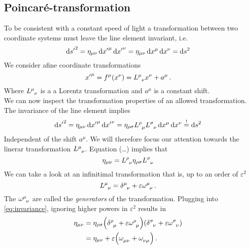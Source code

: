 \subsection{Poincaré-transformation}
To be consistent with a constant speed of light a transformation between two
coordinate systems must leave the line element invariant, i.e.
\begin{equation}
\dif {s^\prime}^2 = \eta_{\mu\nu}\dif {x^\prime}^\mu\dif
{x^\prime}^\nu=\eta_{\mu\nu}\dif x^\mu\dif
x^\nu = \dif s^2
\end{equation}
We consider afine coordinate transformations 
\begin{equation}
{x^\prime}^\mu= f^\mu(x^\nu)=\tensor{L}{^\mu_\nu}x^\nu+a^\mu\, .
\end{equation}
Where $\tensor{L}{^\mu_\nu}$ is a a Lorentz transformation and $a^\mu$ is a
constant shift.\\
We can now inspect the transformation properties of an allowed transformation.
The invariance of the line element implies
\begin{equation}
\dif {s^\prime}^2 = \eta_{\mu\nu}\dif {x^\prime}^\mu\dif
{x^\prime}^\nu=\eta_{\rho\sigma}\tensor{L}{^\rho_\mu}\tensor{L}{^\sigma_\nu}\dif
x^\mu\dif x^\nu \stackrel{!}{=} \dif s^2
\end{equation}
Independent of the shift $a^\mu$. We will therefore focus our attention towards
the linerar transformation $\tensor{L}{^\mu_\nu}$. Equation (\ldots) implies
that
\begin{equation}
\eta_{\mu\nu}=\tensor{L}{^\rho_\nu}\eta_{\rho\sigma}\tensor{L}{^\sigma_\nu}\label{eq:invariance}
\end{equation}
We can take a look at an infinitimal transformation that is, up to an order of
$\varepsilon^2$
\begin{equation}
\tensor{L}{^\mu_\nu}=\tensor{\delta}{^\mu_\nu}
+\varepsilon\tensor{\omega}{^\mu_\nu}\, .
\end{equation}
The $\tensor{\omega}{^\mu_\nu}$ are called the \emph{generators} of the
transformation. Plugging into \eqref{eq:invariance}, ignoring higher powers in
$\varepsilon^2$ results in
\begin{equation}
\begin{split}
\eta_{\mu\nu}&=\eta_{\rho\sigma}\left(\tensor{\delta}{^\rho_\mu}
+\varepsilon\tensor{\omega}{^\rho_\mu}\right)\left(\tensor{\delta}{^\sigma_\nu}
+\varepsilon\tensor{\omega}{^\sigma_\nu}\right)\\
&=
\eta_{\mu\nu}+\varepsilon\left(\tensor{\omega}{_\mu_\nu}+\tensor{\omega}{_\nu_\mu}\right)\,
.
\end{split}
\end{equation}
